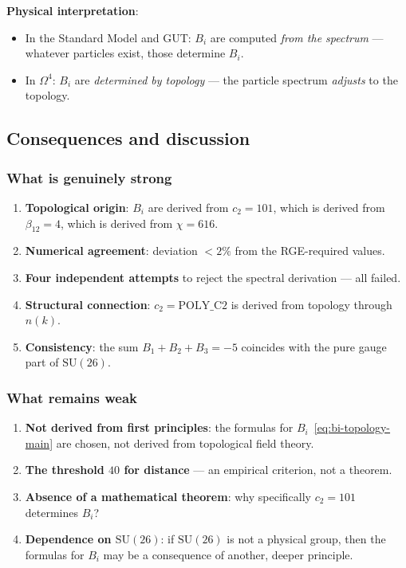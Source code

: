 \documentclass[11pt,a4paper]{article}
\newcommand{\SU}{\ensuremath{\mathrm{SU}}}
\newcommand{\Om}{\ensuremath{\Omega^4}}
\theoremstyle{definition}
\begin{document}
\medskip\noindent
\textbf{Physical interpretation}:
\begin{itemize}
    \item In the Standard Model and GUT: $B_i$ are computed
          \emph{from the spectrum} --- whatever particles exist, those
          determine $B_i$.
    \item In $\Om$: $B_i$ are \emph{determined by topology} ---
          the particle spectrum \emph{adjusts} to the topology.
\end{itemize}

\subsection{Consequences and discussion}
\label{subsec:bi-consequences}

\subsubsection{What is genuinely strong}

\begin{enumerate}
    \item \textbf{Topological origin}: $B_i$ are derived
          from $c_2 = 101$, which is derived from $\beta_{12} = 4$,
          which is derived from $\chi = 616$.
    \item \textbf{Numerical agreement}: deviation $< 2\%$
          from the RGE-required values.
    \item \textbf{Four independent attempts} to reject
          the spectral derivation --- all failed.
    \item \textbf{Structural connection}: $c_2 = \text{POLY\_C2}$
          is derived from topology through $n(k)$.
    \item \textbf{Consistency}: the sum $B_1 + B_2 + B_3 = -5$
          coincides with the pure gauge part of $\SU(26)$.
\end{enumerate}

\subsubsection{What remains weak}

\begin{enumerate}
    \item \textbf{Not derived from first principles}: the formulas
          for $B_i$~\eqref{eq:bi-topology-main} are chosen,
          not derived from topological field theory.
    \item \textbf{The threshold $40$ for distance} --- an empirical
          criterion, not a theorem.
    \item \textbf{Absence of a mathematical theorem}:
          why specifically $c_2 = 101$ determines $B_i$?
    \item \textbf{Dependence on $\SU(26)$}: if $\SU(26)$
          is not a physical group, then the formulas for $B_i$
          may be a consequence of another, deeper
          principle.
\end{enumerate}
\end{document}
